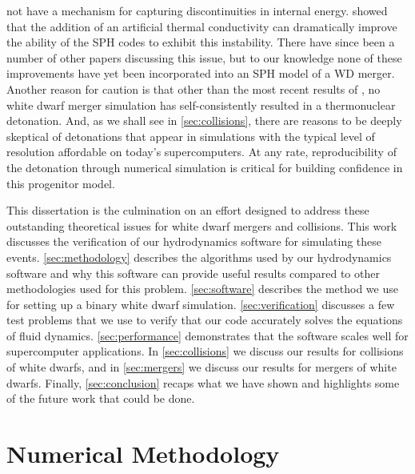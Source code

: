 \documentclass[12pt]{article}
\begin{document}
not have a mechanism for capturing discontinuities in internal
energy. \citeauthor{price:2008} showed that the addition of an
artificial thermal conductivity can dramatically improve the ability
of the SPH codes to exhibit this instability. There have since been a
number of other papers discussing this issue, but to our knowledge
none of these improvements have yet been incorporated into an SPH
model of a WD merger. Another reason for caution is that other than the
most recent results of \cite{kashyap:2015}, no white dwarf merger
simulation has self-consistently resulted in a thermonuclear detonation.
And, as we shall see in \autoref{sec:collisions}, there are reasons to be
deeply skeptical of detonations that appear in simulations with the typical
level of resolution affordable on today's supercomputers. At any rate,
reproducibility of the detonation through numerical simulation is critical
for building confidence in this progenitor model.

This dissertation is the culmination on an effort designed to address these
outstanding theoretical issues for white dwarf mergers and collisions. This work
discusses the verification of our hydrodynamics software for simulating
these events. \autoref{sec:methodology} describes the algorithms used by our
hydrodynamics software and why this software can provide useful results compared to
other methodologies used for this problem. \autoref{sec:software} describes
the method we use for setting up a binary white dwarf simulation.
\autoref{sec:verification} discusses a few test problems that we use
to verify that our code accurately solves the equations of fluid dynamics.
\autoref{sec:performance} demonstrates that the software scales well for
supercomputer applications. In \autoref{sec:collisions} we discuss our
results for collisions of white dwarfs, and in \autoref{sec:mergers} we
discuss our results for mergers of white dwarfs. Finally, \autoref{sec:conclusion}
recaps what we have shown and highlights some of the future work that
could be done.



\newpage
\section{Numerical Methodology}
\label{sec:methodology}
\end{document}
